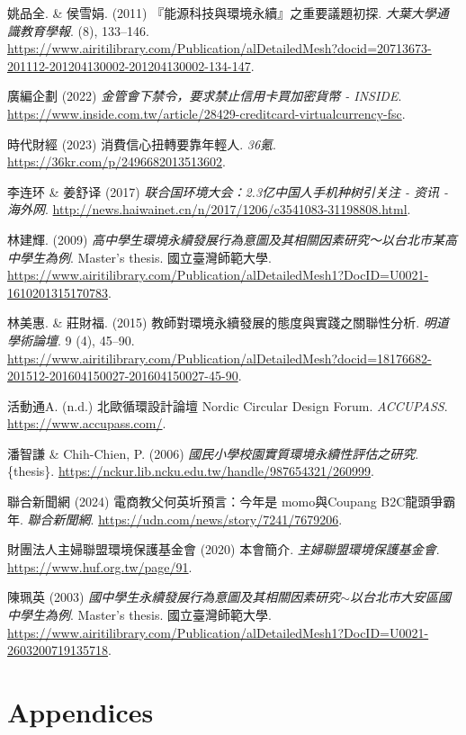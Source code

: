 \documentclass[
  letterpaper,
  DIV=11,
  numbers=noendperiod]{scrartcl}
\newlength{\cslhangindent}
\newenvironment{CSLReferences}[2] %
 {\begin{list}{}{%
  \setlength{\itemindent}{0pt}
  \setlength{\leftmargin}{0pt}
  \setlength{\parsep}{0pt}
  \ifodd #1
   \setlength{\leftmargin}{\cslhangindent}
   \setlength{\itemindent}{-1\cslhangindent}
  \fi
  \setlength{\itemsep}{#2\baselineskip}}}
 {\end{list}}
\begin{document}
\begin{CSLReferences}{0}{1}
姚品全. \& 侯雪娟. (2011) {『能源科技與環境永續』之重要議題初探}.
\emph{大葉大學通識教育學報}. (8), 133--146.
\url{https://www.airitilibrary.com/Publication/alDetailedMesh?docid=20713673-201112-201204130002-201204130002-134-147}.

廣編企劃 (2022) \emph{金管會下禁令，要求禁止信用卡買加密貨幣 -
{INSIDE}}.
\url{https://www.inside.com.tw/article/28429-creditcard-virtualcurrency-fsc}.

時代財經 (2023) 消費信心扭轉要靠年輕人. \emph{36氪}.
\url{https://36kr.com/p/2496682013513602}.

李连环 \& 姜舒译 (2017) \emph{联合国环境大会：2.3亿中国人手机种树引关注
- 资讯 - 海外网}.
\url{http://news.haiwainet.cn/n/2017/1206/c3541083-31198808.html}.

林建輝. (2009)
\emph{{高中學生環境永續發展行為意圖及其相關因素研究～以台北市某高中學生為例}}.
Master's thesis. 國立臺灣師範大學.
\url{https://www.airitilibrary.com/Publication/alDetailedMesh1?DocID=U0021-1610201315170783}.

林美惠. \& 莊財福. (2015) {教師對環境永續發展的態度與實踐之關聯性分析}.
\emph{明道學術論壇}. 9 (4), 45--90.
\url{https://www.airitilibrary.com/Publication/alDetailedMesh?docid=18176682-201512-201604150027-201604150027-45-90}.

活動通A. (n.d.) 北歐循環設計論壇 {Nordic Circular Design Forum}.
\emph{ACCUPASS}. \url{https://www.accupass.com/}.

潘智謙 \& Chih-Chien, P. (2006)
\emph{\emph{{國民小學校園實質環境永續性評估之研究}}}. \{thesis\}.
\url{https://nckur.lib.ncku.edu.tw/handle/987654321/260999}.

聯合新聞網 (2024) {電商教父何英圻預言：今年是 momo與Coupang
B2C龍頭爭霸年}. \emph{聯合新聞網}.
\url{https://udn.com/news/story/7241/7679206}.

財團法人主婦聯盟環境保護基金會 (2020) {本會簡介}.
\emph{主婦聯盟環境保護基金會}. \url{https://www.huf.org.tw/page/91}.

陳珮英 (2003)
\emph{{國中學生永續發展行為意圖及其相關因素研究{\(\sim\)}以台北市大安區國中學生為例}}.
Master's thesis. 國立臺灣師範大學.
\url{https://www.airitilibrary.com/Publication/alDetailedMesh1?DocID=U0021-2603200719135718}.

\end{CSLReferences}

\newpage

\section{Appendices}\label{appendices}

\newpage
\end{document}
